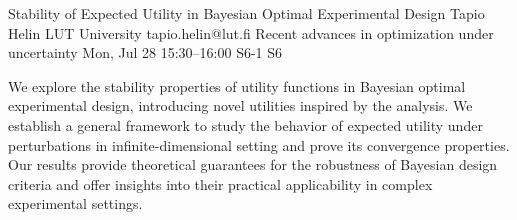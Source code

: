 \documentclass[12pt,lettersize,oneside]{book} %
\begin{document}
\begin{talk}
  {Stability of Expected Utility in Bayesian Optimal Experimental Design}%
  {Tapio Helin}%
  {LUT University}%
  {tapio.helin@lut.fi}%
  {Recent advances in optimization under uncertainty}%
  {}%
  {Mon, Jul 28 15:30--16:00}%
  {S6-1}%
  {S6}%
    
   
We explore the stability properties of utility functions in Bayesian optimal experimental design, introducing novel utilities inspired by the analysis. We establish a general framework to study the behavior of expected utility under perturbations in infinite-dimensional setting and prove its convergence properties. Our results provide theoretical guarantees for the robustness of Bayesian design criteria and offer insights into their practical applicability in complex experimental settings.

\medskip

%
\end{talk}
\end{document}
